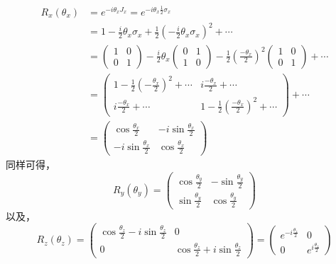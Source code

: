 \begin{equation}
\begin{aligned}
R_{x}\left(\theta_{x}\right) &=e^{-i \theta_{x} J_{x}}=e^{-i \theta_{x} \frac{1}{2} \sigma_{x}} \\
&=1-\frac{i}{2} \theta_{x} \sigma_{x}+\frac{1}{2}\left(-\frac{i}{2} \theta_{x} \sigma_{x}\right)^{2}+\cdots \\
&=\left(\begin{array}{cc}
1 & 0 \\
0 & 1
\end{array}\right)-\frac{i}{2} \theta_{x}\left(\begin{array}{cc}
0 & 1 \\
1 & 0
\end{array}\right)-\frac{1}{2}\left(\frac{-\theta_{x}}{2}\right)^{2}\left(\begin{array}{cc}
1 & 0 \\
0 & 1
\end{array}\right)+\cdots \\
&=\left(\begin{array}{cc}
1-\frac{1}{2}\left(-\frac{\theta_{x}}{2}\right)^{2}+\cdots & i \frac{-\theta_{x}}{2}+\cdots \\
i \frac{-\theta_{x}}{2}+\cdots & 1-\frac{1}{2}\left(\frac{-\theta_{x}}{2}\right)^{2}+\cdots
\end{array}\right)+\cdots \\
&=\left(\begin{array}{cc}
\cos \frac{\theta_{x}}{2} & -i \sin \frac{\theta_{x}}{2} \\
-i \sin \frac{\theta_{x}}{2} & \cos \frac{\theta_{x}}{2}
\end{array}\right)
\end{aligned}
\end{equation}
同样可得，
\begin{equation}
R_{y}\left(\theta_{y}\right)=\left(\begin{array}{cc}
\cos \frac{\theta_{y}}{2} & -\sin \frac{\theta_{y}}{2} \\
\sin \frac{\theta_{y}}{2} & \cos \frac{\theta_{y}}{2}
\end{array}\right)
\end{equation}
以及，
\begin{equation}
R_{z}\left(\theta_{z}\right)=\left(\begin{array}{cc}
\cos \frac{\theta_{z}}{2}-i \sin \frac{\theta_{z}}{2} & 0 \\
0 & \cos \frac{\theta_{z}}{2}+i \sin \frac{\theta_{z}}{2}
\end{array}\right)=\left(\begin{array}{cc}
e^{-i \frac{\theta_{z}}{2}} & 0 \\
0 & e^{i \frac{\theta_{z}}{2}}
\end{array}\right)
\end{equation}
